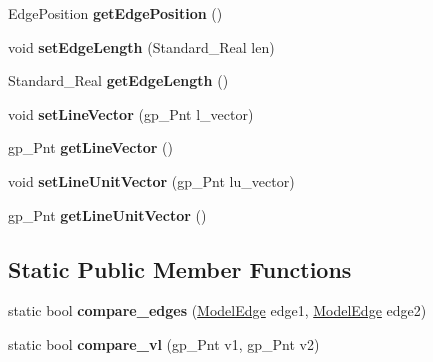 \begin{DoxyCompactItemize}
\item 
\hypertarget{classModelEdge_ab32f96c247c6c5b9ca32928a4b05132b}{Edge\-Position {\bfseries get\-Edge\-Position} ()}\label{classModelEdge_ab32f96c247c6c5b9ca32928a4b05132b}

\item 
\hypertarget{classModelEdge_a970fbeef1a1fd83b0d3dfa7bbcf40530}{void {\bfseries set\-Edge\-Length} (Standard\-\_\-\-Real len)}\label{classModelEdge_a970fbeef1a1fd83b0d3dfa7bbcf40530}

\item 
\hypertarget{classModelEdge_a7bc299ce1147f406905ac89f961632f9}{Standard\-\_\-\-Real {\bfseries get\-Edge\-Length} ()}\label{classModelEdge_a7bc299ce1147f406905ac89f961632f9}

\item 
\hypertarget{classModelEdge_a4116750cf19e091acff7b5ca910f221e}{void {\bfseries set\-Line\-Vector} (gp\-\_\-\-Pnt l\-\_\-vector)}\label{classModelEdge_a4116750cf19e091acff7b5ca910f221e}

\item 
\hypertarget{classModelEdge_a7274e0ba97408832fceaabd9fdcc13f1}{gp\-\_\-\-Pnt {\bfseries get\-Line\-Vector} ()}\label{classModelEdge_a7274e0ba97408832fceaabd9fdcc13f1}

\item 
\hypertarget{classModelEdge_abd033ecdc2b7bdcad613188cfb0f3349}{void {\bfseries set\-Line\-Unit\-Vector} (gp\-\_\-\-Pnt lu\-\_\-vector)}\label{classModelEdge_abd033ecdc2b7bdcad613188cfb0f3349}

\item 
\hypertarget{classModelEdge_a8a5ae73ed6c60758d80c6cff4a418137}{gp\-\_\-\-Pnt {\bfseries get\-Line\-Unit\-Vector} ()}\label{classModelEdge_a8a5ae73ed6c60758d80c6cff4a418137}

\end{DoxyCompactItemize}
\subsection*{Static Public Member Functions}
\begin{DoxyCompactItemize}
\item 
\hypertarget{classModelEdge_a5a99dd41b668434d6dc820f6a2132616}{static bool {\bfseries compare\-\_\-edges} (\hyperlink{classModelEdge}{Model\-Edge} edge1, \hyperlink{classModelEdge}{Model\-Edge} edge2)}\label{classModelEdge_a5a99dd41b668434d6dc820f6a2132616}

\item 
\hypertarget{classModelEdge_a238b22538e45c99a2377a9b31c25aff2}{static bool {\bfseries compare\-\_\-vl} (gp\-\_\-\-Pnt v1, gp\-\_\-\-Pnt v2)}\label{classModelEdge_a238b22538e45c99a2377a9b31c25aff2}

\end{DoxyCompactItemize}
